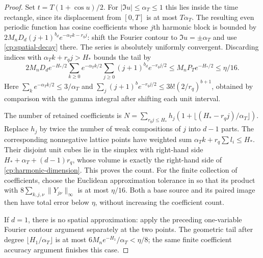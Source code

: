 \begin{proof}
Set $t=T(1+\cos u)/2$. For $|\Im u|\le\alpha_T\le1$ this lies
inside the time rectangle, since its displacement from $[0,T]$ is
at most $T\alpha_T$. The resulting even periodic function has
cosine coefficients whose $j$th harmonic block is bounded by
$2M_nD_d(j+1)^{b_d}e^{-\alpha_Tk-r_qj}$: shift the Fourier contour
to $\Im u=\pm\alpha_T$ and use \eqref{cp:spatial-decay} there.
The series is absolutely uniformly convergent. Discarding indices
with $\alpha_Tk+r_qj>H_*$ bounds the tail by
\[
 2M_nD_de^{-H_*/2}
 \sum_{k\ge0}e^{-\alpha_Tk/2}
 \sum_{j\ge0}(j+1)^{b_d}e^{-r_qj/2}
 \le M_nP_Te^{-H_*/2}\le\eta/16.
\]
Here $\sum_ke^{-\alpha_Tk/2}\le3/\alpha_T$ and
$\sum_j(j+1)^be^{-r_qj/2}\le3b!(2/r_q)^{b+1}$, obtained by
comparison with the gamma integral after shifting each unit interval.

The number of retained coefficients is
$N=\sum_{r_qj\le H_*}h_j(1+\lfloor(H_*-r_qj)/\alpha_T\rfloor)$.
Replace $h_j$ by twice the number of weak compositions of $j$ into
$d-1$ parts. The corresponding nonnegative lattice points have
weighted sum $\alpha_Tk+r_q\sum l_i\le H_*$. Their disjoint unit
cubes lie in the simplex with right-hand side
$H_*+\alpha_T+(d-1)r_q$, whose volume is exactly the right-hand
side of \eqref{cp:harmonic-dimension}. This proves the count.
For the finite collection of coefficients, choose the Euclidean
approximation tolerance in  so that its product with
$8\sum_{k,j,\nu}\|Y_{j\nu}\|_\infty$ is at most $\eta/16$.
Both a base source and its paired image then have total error below
$\eta$, without increasing the coefficient count.

If $d=1$, there is no spatial approximation: apply the preceding
one-variable Fourier contour argument separately at the two points.
The geometric tail after degree $\lfloor H_1/\alpha_T\rfloor$ is
at most $6M_ne^{-H_1}/\alpha_T<\eta/8$; the same finite coefficient
accuracy argument finishes this case.
\end{proof}


